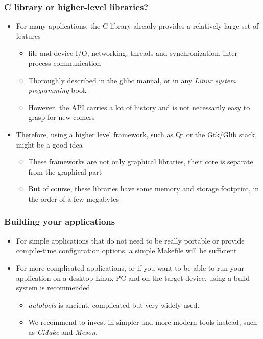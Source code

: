 \begin{frame}
  \frametitle{C library or higher-level libraries?}
  \begin{itemize}
  \item For many applications, the C library already provides a
    relatively large set of features
    \begin{itemize}
    \item file and device I/O, networking, threads and
      synchronization, inter-process communication
    \item Thoroughly described in the glibc manual, or in any {\em
        Linux system programming} book
    \item However, the API carries a lot of history and is not
      necessarily easy to grasp for new comers
    \end{itemize}
  \item Therefore, using a higher level framework, such as Qt or the
    Gtk/Glib stack, might be a good idea
    \begin{itemize}
    \item These frameworks are not only graphical libraries, their
      core is separate from the graphical part
    \item But of course, these libraries have some memory and storage
      footprint, in the order of a few megabytes
    \end{itemize}
  \end{itemize}
\end{frame}

\begin{frame}
  \frametitle{Building your applications}
  \begin{itemize}
  \item For simple applications that do not need to be really portable
    or provide compile-time configuration options, a simple Makefile
    will be sufficient
  \item For more complicated applications, or if you want to be able
    to run your application on a desktop Linux PC and on the target
    device, using a build system is recommended
    \begin{itemize}
    \item {\em autotools} is ancient, complicated but very
      widely used.
    \item We recommend to invest in simpler and more modern tools
          instead, such as {\em CMake} and {\em Meson}.
    \end{itemize}
  \end{itemize}
\end{frame}

